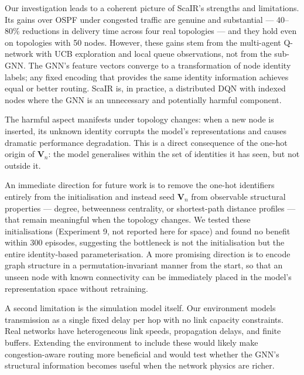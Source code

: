 \documentclass[10pt,twocolumn,letterpaper]{article}
\begin{document}
Our investigation leads to a coherent picture of ScaIR's strengths and
limitations. Its gains over OSPF under congested traffic are genuine and
substantial — 40--80\% reductions in delivery time across four real
topologies — and they hold even on topologies with 50 nodes. However,
these gains stem from the multi-agent Q-network with UCB exploration
and local queue observations, not from the sub-GNN. The GNN's feature
vectors converge to a transformation of node identity labels; any fixed
encoding that provides the same identity information achieves equal or
better routing. ScaIR is, in practice, a distributed DQN with indexed
nodes where the GNN is an unnecessary and potentially harmful component.

The harmful aspect manifests under topology changes: when a new node is
inserted, its unknown identity corrupts the model's representations and
causes dramatic performance degradation. This is a direct consequence
of the one-hot origin of $\mathbf{V}_n$: the model generalises within
the set of identities it has seen, but not outside it.

An immediate direction for future work is to remove the one-hot
identifiers entirely from the initialisation and instead seed
$\mathbf{V}_n$ from observable structural properties — degree,
betweenness centrality, or shortest-path distance profiles — that
remain meaningful when the topology changes. We tested these initialisations
(Experiment 9, not reported here for space) and found no benefit within
300 episodes, suggesting the bottleneck is not the initialisation but
the entire identity-based parameterisation. A more promising direction
is to encode graph structure in a permutation-invariant manner from
the start, so that an unseen node with known connectivity can be
immediately placed in the model's representation space without retraining.

A second limitation is the simulation model itself. Our environment
models transmission as a single fixed delay per hop with no link
capacity constraints. Real networks have heterogeneous link speeds,
propagation delays, and finite buffers. Extending the environment to
include these would likely make congestion-aware routing more
beneficial and would test whether the GNN's structural information
becomes useful when the network physics are richer.
\end{document}
